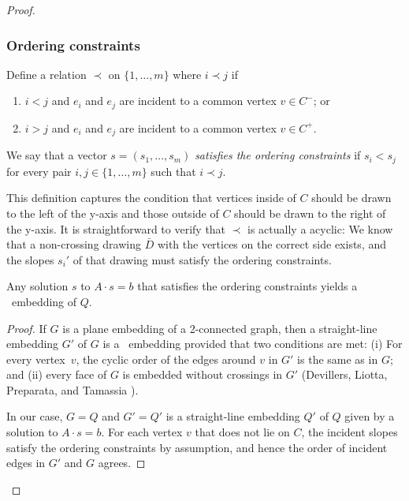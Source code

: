 \begin{proof}
\subsubsection{Ordering constraints}

Define a relation $\prec$ on $\{1,\ldots,m\}$ where $i \prec j$
if
\begin{enumerate}
  \item $i < j$ and $e_i$ and $e_j$ are incident to a common vertex
  $v\in C^-$; or
  \item $i > j$ and $e_i$ and $e_j$ are incident to a common vertex $v\in C^+$.
\end{enumerate}
We say that a vector $s=(s_1,\ldots,s_m)$ \emph{satisfies the ordering constraints} if $s_i <
s_j$ for every pair $i,j\in\{1,\ldots,m\}$ such that $i\prec j$.  

This definition captures the condition that vertices inside of $C$
should be drawn to the left of the y-axis and those outside of $C$
should be drawn to the right of the y-axis.  It is straightforward
to verify that $\prec$ is actually a acyclic: We know that a
non-crossing drawing
$\bar D$ with the vertices on the correct side exists, and the slopes
$s_i'$ of that drawing must satisfy the ordering constraints.

\begin{lem}
   Any solution $s$ to $A\cdot s=b$ that satisfies
 the ordering constraints %
 yields a
   \Fary\ embedding of $Q$.
\end{lem}

\begin{proof}
   If $G$ is a plane embedding of a 2-connected graph, then a
   straight-line embedding $G'$ of $G$ is a \Fary\ embedding provided
   that two conditions are met:
(i) For every vertex~$v$, the cyclic order of the
   edges around $v$ in $G'$ is the same as in $G$; and
(ii) every face of $G$ is embedded without crossings in $G'$
(Devillers, Liotta, Preparata, and Tamassia \cite[Lemma~16]{devillers.liotta.ea:checking}).

In our case, $G=Q$ and $G'=Q'$ is a straight-line embedding $Q'$ of
$Q$ given by a solution to $A\cdot s = b$.  For each vertex $v$ that
does not lie on $C$, the incident slopes satisfy the ordering constraints
by assumption, and hence the order of incident edges in $G'$ and $G$
agrees.


\end{proof}
\end{proof}
